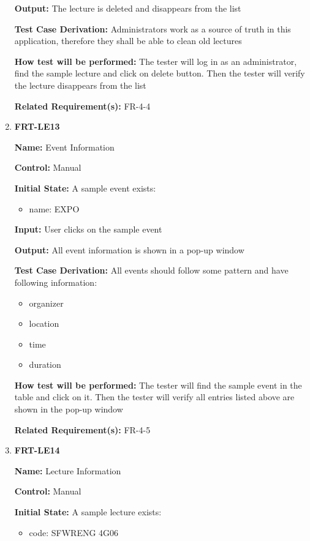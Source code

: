 \documentclass[12pt, titlepage]{article}
\begin{document}
\begin{enumerate}
\textbf{Output:} The lecture is deleted and disappears from the list

\textbf{Test Case Derivation:} Administrators work as a source of truth in this application, therefore they shall be able to clean old lectures
					
\textbf{How test will be performed:} The tester will log in as an administrator, find the sample lecture and click on delete button. Then the tester will verify the lecture disappears from the list

\textbf{Related Requirement(s):} FR-4-4

\item{\textbf{FRT-LE13}}

\textbf{Name:} Event Information

\textbf{Control:} Manual
					
\textbf{Initial State:} A sample event exists:
\begin{itemize}
\item name: EXPO
\end{itemize}

\textbf{Input:} User clicks on the sample event
					
\textbf{Output:} All event information is shown in a pop-up window

\textbf{Test Case Derivation:} All events should follow some pattern and have following information:
\begin{itemize}
\item organizer
\item location
\item time
\item duration
\end{itemize}
					
\textbf{How test will be performed:} The tester will find the sample event in the table and click on it. Then the tester will verify all entries listed above are shown in the pop-up window

\textbf{Related Requirement(s):} FR-4-5

\item{\textbf{FRT-LE14}}

\textbf{Name:} Lecture Information

\textbf{Control:} Manual
					
\textbf{Initial State:} A sample lecture exists:
\begin{itemize}
\item code: SFWRENG 4G06
\end{itemize}


\end{enumerate}
\end{document}
